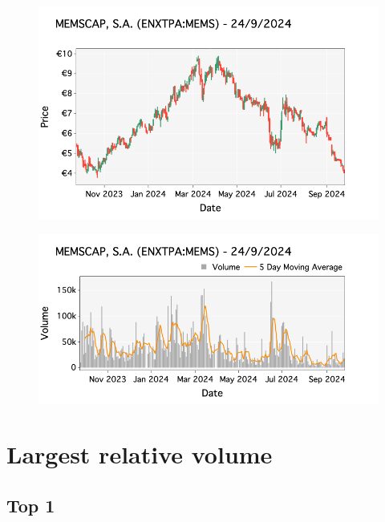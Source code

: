 \documentclass[a4paper, twocolumn, 11pt, paperequity]{gorgona}
\begin{document}
\begin{figure}[H]
    \centering
    \includegraphics[width=\columnwidth]{France/images/Bottom_Returns/Bottom_5_candlestick.png}
\end{figure}

\begin{figure}[H]
    \centering
    \includegraphics[width=\columnwidth]{France/images/Bottom_Returns/Bottom_5_volume.png}
\end{figure}



\newpage
\section*{Largest relative volume}
\subsection*{Top 1}
\end{document}
